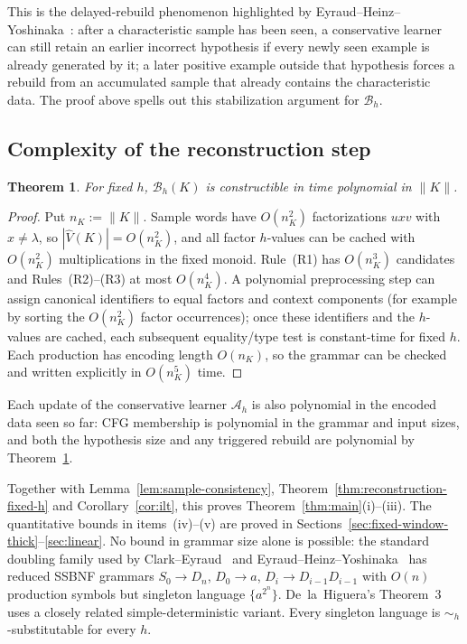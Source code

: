 \documentclass[11pt,a4paper]{article}
\newtheorem{theorem}{Theorem}[section]
\theoremstyle{remark}
\theoremstyle{plain}
\begin{document}
This is the delayed-rebuild phenomenon highlighted by
Eyraud--Heinz--Yoshinaka~\cite[Appendix]{eyraud-heinz-yoshinaka2016}:
after a characteristic sample has been seen, a conservative learner can
still retain an earlier incorrect hypothesis if every newly seen example is
already generated by it; a later positive example outside that hypothesis
forces a rebuild from an accumulated sample that already contains the
characteristic data.  The proof above spells out this stabilization argument
for $\mathcal B_h$.

\subsection{Complexity of the reconstruction step}
\label{sec:complexity}

\begin{theorem}\label{thm:poly-build}
For fixed $h$, $\mathcal B_h(K)$ is constructible in time polynomial in
$\|K\|$.
\end{theorem}
\begin{proof}
Put $n_K:=\|K\|$.  Sample words have $O(n_K^2)$ factorizations $uxv$ with
$x\ne\lambda$, so $|\widehat V(K)|=O(n_K^2)$, and all factor $h$-values can
be cached with $O(n_K^2)$ multiplications in the fixed monoid.  Rule~(R1) has
$O(n_K^3)$ candidates and Rules~(R2)--(R3) at most $O(n_K^4)$.  A polynomial
preprocessing step can assign canonical identifiers to equal factors and
context components (for example by sorting the $O(n_K^2)$ factor
occurrences); once these identifiers and the $h$-values are cached, each
subsequent equality/type test is constant-time for fixed $h$.  Each production
has encoding length $O(n_K)$, so the grammar can
be checked and written explicitly in $O(n_K^5)$ time.
\end{proof}

Each update of the conservative learner $\mathcal A_h$ is also polynomial
in the encoded data seen so far: CFG membership is polynomial in the grammar
and input sizes, and both the hypothesis size and any triggered rebuild are
polynomial by Theorem~\ref{thm:poly-build}.

Together with Lemma~\ref{lem:sample-consistency},
Theorem~\ref{thm:reconstruction-fixed-h} and Corollary~\ref{cor:ilt}, this
proves Theorem~\ref{thm:main}(i)--(iii).  The quantitative bounds in
items~(iv)--(v) are proved in Sections~\ref{sec:fixed-window-thick}--\ref{sec:linear}.
No bound in grammar size alone is possible: the standard doubling family
used by Clark--Eyraud~\cite[Example~2]{clark-eyraud2007} and
Eyraud--Heinz--Yoshinaka~\cite[Example~2.3]{eyraud-heinz-yoshinaka2016}
has reduced SSBNF grammars
$S_0\to D_n$, $D_0\to a$, $D_i\to D_{i-1}D_{i-1}$ with $O(n)$
production symbols but singleton language $\{a^{2^n}\}$.  De~la~Higuera's
Theorem~3~\cite{higuera1997} uses a closely related simple-deterministic
variant.  Every singleton language is $\sim_h$-substitutable for every $h$.
\end{document}
